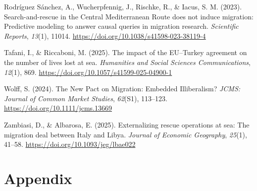 \documentclass[
  11pt,
  a4paper,
]{article}
\newlength{\cslhangindent}
\newenvironment{CSLReferences}[2] %
 {\begin{list}{}{%
  \setlength{\itemindent}{0pt}
  \setlength{\leftmargin}{0pt}
  \setlength{\parsep}{0pt}
  \ifodd #1
   \setlength{\leftmargin}{\cslhangindent}
   \setlength{\itemindent}{-1\cslhangindent}
  \fi
  \setlength{\itemsep}{#2\baselineskip}}}
 {\end{list}}
\begin{document}
\begin{CSLReferences}{1}{0}
Rodríguez Sánchez, A., Wucherpfennig, J., Rischke, R., \& Iacus, S. M.
(2023). Search-and-rescue in the {Central Mediterranean Route} does not
induce migration: {Predictive} modeling to answer causal queries in
migration research. \emph{Scientific Reports}, \emph{13}(1), 11014.
\url{https://doi.org/10.1038/s41598-023-38119-4}

Tafani, I., \& Riccaboni, M. (2025). The impact of the {EU}--{Turkey}
agreement on the number of lives lost at sea. \emph{Humanities and
Social Sciences Communications}, \emph{12}(1), 869.
\url{https://doi.org/10.1057/s41599-025-04900-1}

Wolff, S. (2024). The {New Pact} on {Migration}: {Embedded
Illiberalism}? \emph{JCMS: Journal of Common Market Studies},
\emph{62}(S1), 113--123. \url{https://doi.org/10.1111/jcms.13669}

Zambiasi, D., \& Albarosa, E. (2025). Externalizing rescue operations at
sea: {The} migration deal between {Italy} and {Libya}. \emph{Journal of
Economic Geography}, \emph{25}(1), 41--58.
\url{https://doi.org/10.1093/jeg/lbae022}

\end{CSLReferences}

\newpage

\appendix

\section*{Appendix}\label{appendix}
\end{document}
